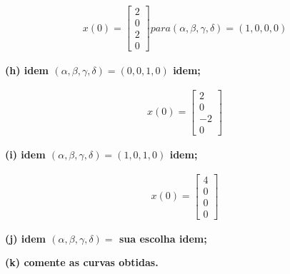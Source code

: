 \documentclass[11pt]{article}
\begin{document}
\begin{align*}
  x(0) =
  \begin{bmatrix}
    2 \\
    0\\
    2\\
    0
  \end{bmatrix}
  para (\alpha, \beta, \gamma, \delta) = (1, 0, 0, 0)
\end{align*}

\textbf{(h) idem $(\alpha, \beta, \gamma, \delta) = (0, 0, 1, 0)$ idem;}

\begin{align*}
  x(0) =
  \begin{bmatrix}
    2 \\
    0\\
    -2\\
    0
  \end{bmatrix}
\end{align*}

\textbf{(i) idem $(\alpha, \beta, \gamma, \delta) = (1, 0, 1, 0)$ idem;}

\begin{align*}
  x(0) =
  \begin{bmatrix}
    4 \\
    0\\
    0\\
    0
  \end{bmatrix}
\end{align*}

\textbf{(j) idem $(\alpha, \beta, \gamma, \delta) = $ sua escolha idem;}

\textbf{(k) comente as curvas obtidas.}
\end{document}
